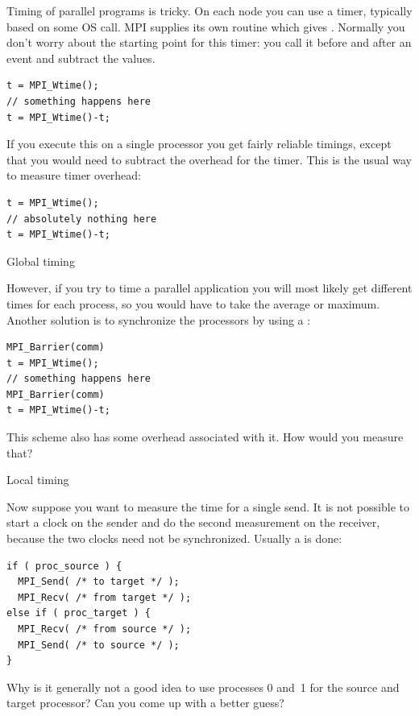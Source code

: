 Timing of parallel programs is tricky. On each node you can use a timer,
typically based on some \ac{OS} call. MPI supplies its own routine
 which gives .
Normally you don't worry about the starting point for this timer: 
you call it before and after an event and subtract the values.
\begin{verbatim}
t = MPI_Wtime();
// something happens here
t = MPI_Wtime()-t;
\end{verbatim}
If you execute this on a single processor you get fairly reliable
timings, except that you would need to subtract the overhead for the
timer. This is the usual way to measure timer overhead:
\begin{verbatim}
t = MPI_Wtime();
// absolutely nothing here
t = MPI_Wtime()-t;
\end{verbatim}

 {Global timing}

However, if you try to time a parallel application you will most likely
get different times for each process, so you would have to take the
average or maximum.  Another solution is to synchronize the processors
by using a :
\begin{verbatim}
MPI_Barrier(comm)
t = MPI_Wtime();
// something happens here
MPI_Barrier(comm)
t = MPI_Wtime()-t;
\end{verbatim}

\begin{exercise}
  This scheme also has some overhead associated with it. How would you measure that?
\end{exercise}

 {Local timing}
\label{sec:ping-time}

Now suppose you want to measure the time for a single send. It is not possible
to start a clock on the sender and do the second measurement on the receiver,
because the two clocks need not be synchronized. Usually a  is 
done: 
\begin{verbatim}
if ( proc_source ) {
  MPI_Send( /* to target */ );
  MPI_Recv( /* from target */ );
else if ( proc_target ) {
  MPI_Recv( /* from source */ );
  MPI_Send( /* to source */ );
}
\end{verbatim}

\begin{exercise}
  Why is it generally not a good idea to use processes 0 and~1 for the
  source and target processor?  Can you come up with a better guess?
\end{exercise}

